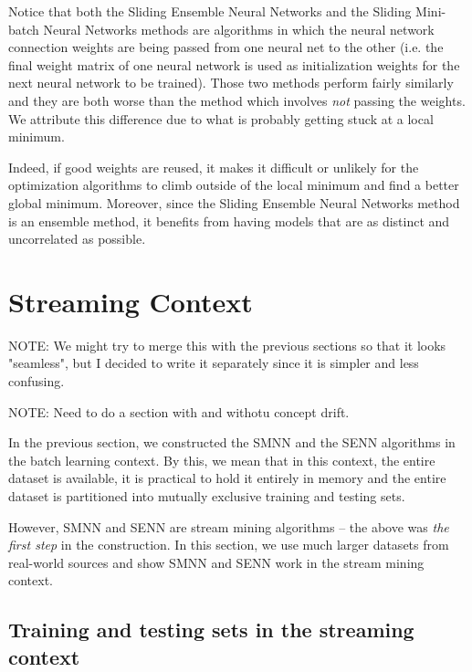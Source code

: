 \documentclass[conference]{IEEEtran}
\begin{document}
Notice that both the Sliding Ensemble Neural Networks and the Sliding Mini-batch Neural Networks methods are algorithms in which the neural network connection weights are being passed from one neural net to the other (i.e. the final weight matrix of one neural network is used as initialization weights for the next neural network to be trained). Those two methods perform fairly similarly and they are both worse than the method which involves \emph{not} passing the weights. We attribute this difference due to what is probably getting stuck at a local minimum.

Indeed, if good weights are reused, it makes it  difficult or unlikely for the optimization algorithms to climb outside of the local minimum and find a better global minimum. Moreover, since the Sliding Ensemble Neural Networks method is an ensemble method, it benefits from having models that are as distinct and uncorrelated as possible.

\section{Streaming Context}

NOTE: We might try to merge this with the previous sections so that it looks "seamless", but I decided to write it separately since it is simpler and less confusing.

NOTE: Need to do a section with and withotu concept drift.

In the previous section, we constructed the SMNN and the SENN algorithms in the batch learning context. By this, we mean that in this context, the entire dataset is available, it is practical to hold it entirely in memory and the entire dataset is partitioned into mutually exclusive training and testing sets.

However, SMNN and SENN are stream mining algorithms -- the above was \emph{the first step} in the construction. In this section, we use much larger datasets from real-world sources and show SMNN and SENN work in the stream mining context.

\subsection{Training and testing sets in the streaming context}
\end{document}
